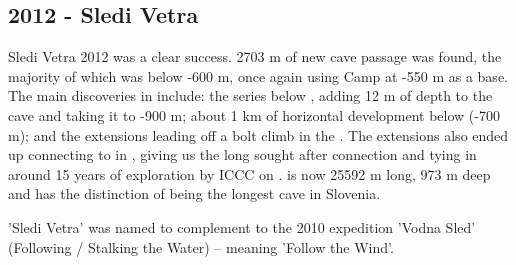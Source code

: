 \begin{tcolorbox}
\chapter{2012 - Sledi Vetra}

Sledi Vetra 2012 was a clear success. 2703 m of new cave passage was
found, the majority of which was below -600 m, once again using Camp
 at -550 m as a base. The main discoveries in
 include: the  series below
, adding 12 m of depth to the cave and taking it to -900 m;
about 1 km of horizontal development below 
(-700 m); and the  extensions leading off a bolt climb in
the . The  extensions also ended
up connecting to  in , giving us the long
sought after connection and tying in around 15 years of
exploration by ICCC on .  is now 25592 m long, 973
m deep and has the distinction of being the longest cave in Slovenia.

'Sledi Vetra' was named to complement to the 2010 expedition 'Vodna Sled' (Following / Stalking the Water) -- meaning 'Follow the Wind'.


\end{tcolorbox}
\BgThispage

